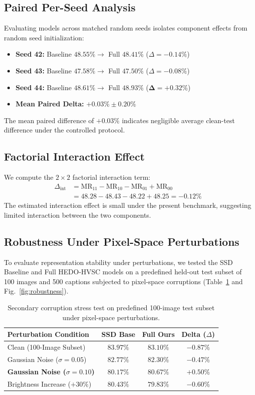 \documentclass[journal]{IEEEtran}
\begin{document}
\subsection{Paired Per-Seed Analysis}
Evaluating models across matched random seeds isolates component effects from random seed initialization:
\begin{itemize}
    \item \textbf{Seed 42:} Baseline $48.55\% \rightarrow$ Full $48.41\%$ ($\Delta = -0.14\%$)
    \item \textbf{Seed 43:} Baseline $47.58\% \rightarrow$ Full $47.50\%$ ($\Delta = -0.08\%$)
    \item \textbf{Seed 44:} Baseline $48.61\% \rightarrow$ Full $48.93\%$ ($\mathbf{\Delta = +0.32\%}$)
    \item \textbf{Mean Paired Delta:} $\mathbf{+0.03\% \pm 0.20\%}$
\end{itemize}
The mean paired difference of $+0.03\%$ indicates negligible average clean-test difference under the controlled protocol.

\subsection{Factorial Interaction Effect}
We compute the $2 \times 2$ factorial interaction term:
\begin{align}
\Delta_{\text{int}} &= \text{MR}_{11} - \text{MR}_{10} - \text{MR}_{01} + \text{MR}_{00} \nonumber \\
&= 48.28 - 48.43 - 48.22 + 48.25 = -0.12\%
\end{align}
The estimated interaction effect is small under the present benchmark, suggesting limited interaction between the two components.

\subsection{Robustness Under Pixel-Space Perturbations}
To evaluate representation stability under perturbations, we tested the SSD Baseline and Full HEDO-HVSC models on a predefined held-out test subset of 100 images and 500 captions subjected to pixel-space corruptions (Table~\ref{tab:robustness} and Fig.~\ref{fig:robustness}).

\begin{table}[h]
\centering
\caption{Secondary corruption stress test on predefined 100-image test subset under pixel-space perturbations.}
\label{tab:robustness}
\begin{tabular}{lccc}
\toprule
\textbf{Perturbation Condition} & \textbf{SSD Base} & \textbf{Full Ours} & \textbf{Delta ($\Delta$)} \\
\midrule
Clean (100-Image Subset) & $83.97\%$ & $83.10\%$ & $-0.87\%$ \\
Gaussian Noise ($\sigma=0.05$) & $82.77\%$ & $82.30\%$ & $-0.47\%$ \\
\textbf{Gaussian Noise ($\sigma=0.10$)} & $80.17\%$ & $\mathbf{80.67\%}$ & $\mathbf{+0.50\%}$ \\
Brightness Increase ($+30\%$) & $80.43\%$ & $79.83\%$ & $-0.60\%$ \\
\bottomrule
\end{tabular}
\end{table}
\end{document}
